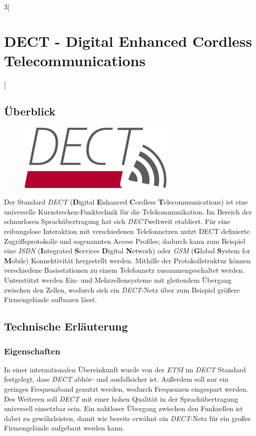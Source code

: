 \begin{multicols}{3}[\section{DECT - Digital Enhanced Cordless Telecommunications}]
\subsection*{Überblick}
\begin{figure}
  \vspace{-20pt}
  \begin{center}
  	\hspace{-20pt}
    \includegraphics[width=0.7\linewidth]{Kapitel/DECT/Grafiken/logo.png}
  \end{center}
  \vspace{-15pt}
\end{figure}
Der Standard \textit{DECT} (\textbf{D}igital \textbf{E}nhanced \textbf{C}ordless \textbf{T}elecommunications) ist eine universelle Kurzstrecken-Funktechnik für die Telekommunikation. Im Bereich der schnurlosen Sprachübertragung hat sich \textit{DECT}weltweit etabliert.
Für eine reibungslose Interaktion mit verschiedenen Telefonnetzen nutzt DECT definierte Zugriffsprotokolle und sogenannten Access Profiles; dadurch kann zum Beispiel eine \textit{ISDN} (\textbf{I}ntegrated \textbf{S}ervices \textbf{D}igital \textbf{N}etwork) oder \textit{GSM} (\textbf{G}lobal \textbf{S}ystem for \textbf{M}obile) Konnektivität hergestellt werden. 
Mithilfe der Protokollstruktur können verschiedene Basisstationen zu einem Telefonnetz zusammengeschaltet werden. Unterstützt werden Ein- und Mehrzellensysteme mit gleitendem Übergang zwischen den Zellen, wodurch sich ein \textit{DECT}-Netz über zum Beispiel größere Firmengelände aufbauen lässt.
\cite{dect.1}

\subsection*{Technische Erläuterung}

\subsubsection*{Eigenschaften}
In einer internationalen Übereinkunft wurde von der \textit{ETSI} im \textit{DECT} Standard festgelegt, dass \textit{DECT} abhör- und ausfallsicher ist. Außerdem soll nur ein geringes Frequenzband genutzt werden, wodurch Frequenzen eingespart werden. Des Weiteren soll \textit{DECT} mit einer hohen Qualität in der Sprachübertragung universell einsetzbar sein. Ein nahtloser Übergang zwischen den Funkzellen ist dabei zu gewährleisten, damit wie bereits erwähnt ein \textit{DECT}-Netz für ein großes Firmengelände aufgebaut werden kann.


\end{multicols}
